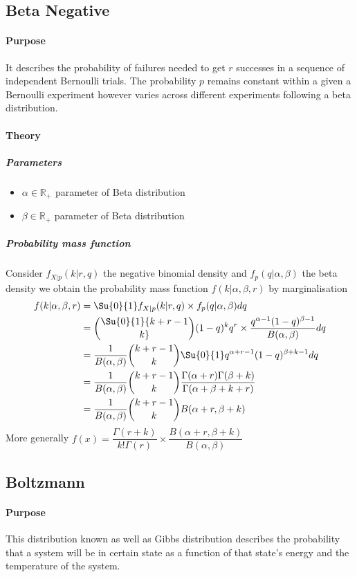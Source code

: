 \subsection{Beta Negative}
\paragraph{Purpose}
It describes the probability of failures needed to get $r$ successes in a sequence of independent
Bernoulli trials. The probability $p$ remains constant within a given a Bernoulli experiment however
varies across different experiments following a beta distribution.
\paragraph{Theory}
\subparagraph{Parameters}
\begin{itemize}
    \item $\alpha\in\mathbb{R}_{+}$ parameter of Beta distribution
    \item $\beta\in\mathbb{R}_{+}$ parameter of Beta distribution
\end{itemize}
\subparagraph{Probability mass function}
Consider $f_{X|p}(k|r, q)$ the negative binomial density and $f_{p}(q|\alpha,\beta)$ the beta density
we obtain the probability mass function $f(k|\alpha, \beta, r)$ by marginalisation
\begin{align*}
    f(k|\alpha,\beta,r) &= \Su{0}{1}f_{X|p}(k|r,q)\times f_{p}(q|\alpha, \beta)dq\\
                        &= \Su{0}{1}{k+r-1\choose k}(1-q)^{k}q^{r}\times \dfrac{q^{\alpha -1}(1-q)^{\beta -1}}{B(\alpha, \beta)}dq\\
                        &= \dfrac{1}{B(\alpha, \beta)}{k+r-1\choose k}\Su{0}{1}q^{\alpha + r-1}(1-q)^{\beta +k-1}dq\\
                        &= \dfrac{1}{B(\alpha, \beta)}{k+r-1\choose k}\dfrac{\Gamma(\alpha + r)\Gamma(\beta + k)}{\Gamma(\alpha + \beta + k + r)}\\
                        &= \dfrac{1}{B(\alpha, \beta)}{k+r-1\choose k}B(\alpha + r, \beta + k)
\end{align*}
More generally $f(x) = \dfrac{\Gamma(r+k)}{k!\Gamma(r)}\times\dfrac{B(\alpha + r, \beta + k)}{B(\alpha,\beta)}$

\subsection{Boltzmann}
\paragraph{Purpose}
This distribution known as well as Gibbs distribution describes the probability that a system will be
in certain state as a function of that state's energy and the temperature of the system.
